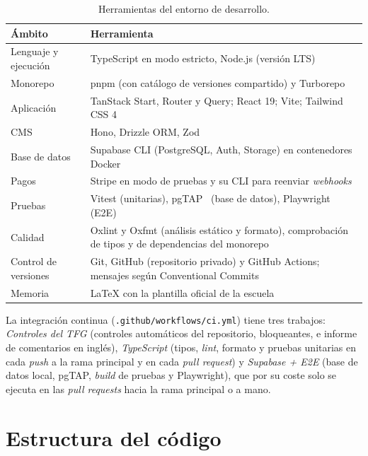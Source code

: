 \begin{table}[htbp]
  \centering
  \footnotesize
  \caption{Herramientas del entorno de desarrollo.}
  \label{tab:imp-herramientas}
  \begin{tabularx}{\textwidth}{@{}>{\raggedright\arraybackslash}p{3.4cm}X@{}}
    \toprule
    \textbf{Ámbito} & \textbf{Herramienta} \\
    \midrule
    Lenguaje y ejecución & TypeScript en modo estricto, Node.js (versión LTS) \\
    Monorepo & pnpm (con catálogo de versiones compartido) y Turborepo~\cite{turborepo} \\
    Aplicación & TanStack Start, Router y Query; React 19; Vite; Tailwind CSS 4 \\
    CMS & Hono, Drizzle ORM, Zod \\
    Base de datos & Supabase CLI (PostgreSQL, Auth, Storage) en contenedores Docker \\
    Pagos & Stripe en modo de pruebas y su CLI para reenviar \textit{webhooks} \\
    Pruebas & Vitest (unitarias), pgTAP~\cite{pgtap} (base de datos), Playwright~\cite{playwright} (E2E) \\
    Calidad & Oxlint y Oxfmt (análisis estático y formato), comprobación de tipos y de dependencias del monorepo \\
    Control de versiones & Git, GitHub (repositorio privado) y GitHub Actions; mensajes según Conventional Commits~\cite{conventionalcommits} \\
    Memoria & \LaTeX{} con la plantilla oficial de la escuela \\
    \bottomrule
  \end{tabularx}
\end{table}

La integración continua (\texttt{.github/workflows/ci.yml}) tiene tres
trabajos: \emph{Controles del TFG} (controles automáticos del repositorio, bloqueantes, e
informe de comentarios en inglés), \emph{TypeScript} (tipos, \textit{lint}, formato y
pruebas unitarias en cada \textit{push} a la rama principal y en cada \textit{pull request}) y
\emph{Supabase + E2E} (base de datos local, pgTAP, \textit{build} de pruebas y
Playwright), que por su coste solo se ejecuta en las \textit{pull requests}
hacia la rama principal o a mano.

\section{Estructura del código}
\label{sec:imp-estructura}

